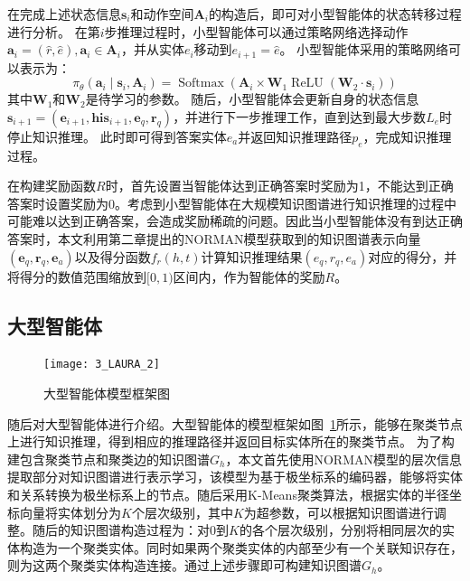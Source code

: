 \documentclass[algorithmlist, AutoFakeBold, AutoFakeSlant, figurelist, tablelist, nomlist, engineering, openany]{seuthesix} %
\begin{document}
在完成上述状态信息$\bm{s}_i$和动作空间$\bm{A}_i$的构造后，即可对小型智能体的状态转移过程进行分析。
在第$i$步推理过程时，小型智能体可以通过策略网络选择动作$\bm{a}_i = (\hat{r}, \hat{e}), \bm{a}_i \in \bm{A}_i$，并从实体$e_i$移动到$e_{i+1} = \hat{e}$。
小型智能体采用的策略网络可以表示为：
\begin{equation}
  \pi_\theta\left(\bm{a}_i \mid \bm{s}_i, \bm{A}_i\right) =\operatorname{Softmax}\left(\bm{A}_i \times \mathbf{W}_1 \operatorname{ReLU}\left(\mathbf{W}_2 \cdot \bm{s}_i\right)\right)
\end{equation}
其中$\mathbf{W}_1$和$\mathbf{W}_2$是待学习的参数。
随后，小型智能体会更新自身的状态信息$\bm{s}_{i+1} = (\bm{e}_{i+1}, \bm{his}_{i+1}, \bm{e}_q, \bm{r}_q)$，并进行下一步推理工作，直到达到最大步数$L_e$时停止知识推理。
此时即可得到答案实体$e_a$并返回知识推理路径$p_e$，完成知识推理过程。

在构建奖励函数$R$时，首先设置当智能体达到正确答案时奖励为1，不能达到正确答案时设置奖励为0。考虑到小型智能体在大规模知识图谱进行知识推理的过程中可能难以达到正确答案，会造成奖励稀疏的问题。因此当小型智能体没有到达正确答案时，本文利用第二章提出的NORMAN模型获取到的知识图谱表示向量$(\bm{e}_q, \bm{r}_q, \bm{e}_a)$以及得分函数$f_r(h, t)$计算知识推理结果$(e_q, r_q, e_a)$对应的得分，并将得分的数值范围缩放到$[0, 1)$区间内，作为智能体的奖励$R$。

\subsection{大型智能体}
\begin{figure}
  \centering
  \texttt{[image: 3\_LAURA\_2]}
  \caption{大型智能体模型框架图}
  \label{3_LAURA_2}
\end{figure}
随后对大型智能体进行介绍。大型智能体的模型框架如图~\ref{3_LAURA_2}所示，能够在聚类节点上进行知识推理，得到相应的推理路径并返回目标实体所在的聚类节点。
为了构建包含聚类节点和聚类边的知识图谱$G_h$，本文首先使用NORMAN模型的层次信息提取部分对知识图谱进行表示学习，该模型为基于极坐标系的编码器，能够将实体和关系转换为极坐标系上的节点。随后采用K-Means聚类算法，根据实体的半径坐标向量将实体划分为$K$个层次级别，其中$K$为超参数，可以根据知识图谱进行调整。随后的知识图谱构造过程为：对0到$K$的各个层次级别，分别将相同层次的实体构造为一个聚类实体。同时如果两个聚类实体的内部至少有一个关联知识存在，则为这两个聚类实体构造连接。通过上述步骤即可构建知识图谱$G_h$。
\end{document}
